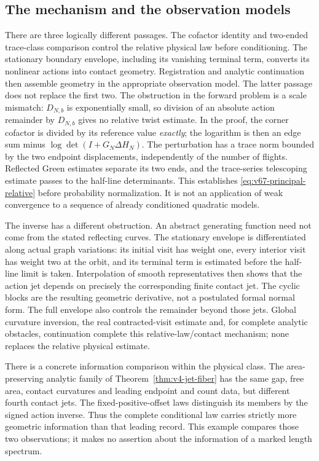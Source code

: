 \subsection{The mechanism and the observation models}

There are three logically different passages.  The cofactor identity and
two-ended trace-class comparison control the relative physical law before
conditioning.  The stationary boundary envelope, including its vanishing
terminal term, converts its nonlinear actions into contact geometry.
Registration and analytic continuation then assemble geometry in the
appropriate observation model.  The latter passage does not replace the
first two.  The obstruction in the forward problem is a scale mismatch:
$D_{N,b}$ is exponentially small, so division of an absolute action
remainder by $D_{N,b}$ gives no relative twist estimate.  In the proof,
the corner cofactor is divided by its reference value \emph{exactly};
the logarithm is then an edge sum minus
$\log\det(I+G_N\Delta H_N)$.  The perturbation has a trace norm
bounded by the two endpoint displacements, independently of the number
of flights.  Reflected Green estimates separate its two ends, and the
trace-series telescoping estimate passes to the half-line determinants.
This establishes \eqref{eq:v67-principal-relative} before probability
normalization.  It is not an application of weak convergence to a
sequence of already conditioned quadratic models.

The inverse has a different obstruction.  An abstract generating
function need not come from the stated reflecting curves.  The
stationary envelope is differentiated along actual graph variations:
its initial visit has weight one, every interior visit has weight two
at the orbit, and its terminal term is estimated before the half-line
limit is taken.  Interpolation of smooth representatives then shows
that the action jet depends on precisely the corresponding finite
contact jet.  The cyclic blocks are the resulting geometric derivative,
not a postulated formal normal form.  The full envelope also controls
the remainder beyond those jets.  Global curvature inversion, the real
contracted-visit estimate and, for complete analytic obstacles,
continuation complete this relative-law/contact mechanism; none replaces
the relative physical estimate.

There is a concrete information comparison within the physical class.
The area-preserving analytic family of
Theorem~\ref{thm:v4-jet-fiber} has the same gap, free area, contact
curvatures and leading endpoint and count data, but different fourth
contact jets.  The fixed-positive-offset laws distinguish its members
by the signed action inverse.  Thus the complete conditional law carries
strictly more geometric information than that leading record.  This
example compares those two observations; it makes no assertion about
the information of a marked length spectrum.

